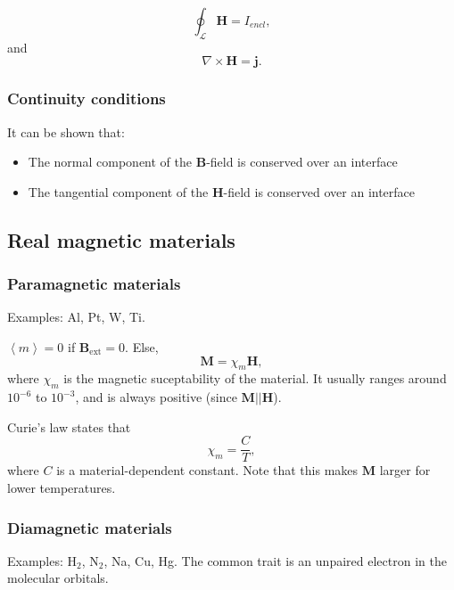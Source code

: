 \documentclass[a4paper, 12pt]{article}
\renewcommand{\vec}[1]{\mathbf{#1}}
\renewcommand{\j}{\ensuremath{\vec{j}}}
\newcommand{\B}{\ensuremath{\vec{B}}}
\renewcommand{\H}{\ensuremath{\vec{H}}}
\begin{document}
        \begin{equation}
            \oint_\mathcal{L}\H = I_{encl},
        \end{equation}
        and 
        \begin{equation}
            \nabla\times\H = \j.
        \end{equation}
        
        \subsubsection{Continuity conditions}
            It can be shown that:
            \begin{itemize}
                \item The normal component of the \B-field is conserved over an interface
                \item The tangential component of the \H-field is conserved over an interface
            \end{itemize}

    \subsection{Real magnetic materials}
        \subsubsection{Paramagnetic materials}
            Examples: Al, Pt, W, Ti.

            $\left<m\right>=0$ if $\B_{\text{ext}} = 0$. Else, 
            \begin{equation}
                \vec{M} = \chi_m\H,
            \end{equation}
            where $\chi_m$ is the magnetic suceptability of the material. 
            It usually ranges around $10^{-6}$ to $10^{-3}$, and is always positive (since $\vec{M} || \H$).

            Curie's law states that 
            \begin{equation}
                \chi_m = \frac{C}{T}, 
            \end{equation}
            where $C$ is a material-dependent constant. Note that this makes $\vec{M}$ larger for lower temperatures.

        \subsubsection{Diamagnetic materials}
            Examples: $\text{H}_2$, $\text{N}_2$, Na, Cu, Hg. The common trait is an unpaired electron in the molecular orbitals.
            
\end{document}
